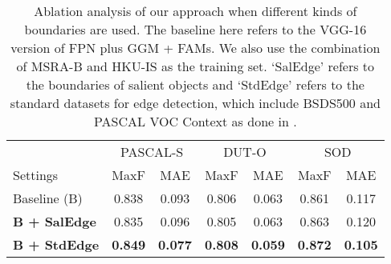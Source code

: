 \documentclass[10pt,twocolumn,letterpaper]{article}
\newcommand{\sorb}[1]{{\textcolor[rgb]{0.72,0.00,0.00}{\textbf{#1}}}}
\begin{document}
\begin{table}[tp]
  \centering
  \small
  \setlength\tabcolsep{1.3mm}
  \begin{tabular}{lcccccc}
    \toprule[1pt]
       & \multicolumn{2}{c}{PASCAL-S \cite{li2014secrets}} & \multicolumn{2}{c}{DUT-O \cite{yang2013saliency}} & \multicolumn{2}{c}{SOD \cite{movahedi2010design}} \\
	\cmidrule(l){2-3} \cmidrule(l){4-5} \cmidrule(l){6-7} 
    Settings & MaxF & MAE & MaxF & MAE & MaxF & MAE \\ \midrule[1pt]
    Baseline (B)  & 0.838 & 0.093 & 0.806 & 0.063 & 0.861 & 0.117  \\ \textbf{B + SalEdge}     & 0.835 & 0.096 & 0.805 & 0.063 & 0.863 & 0.120 \\
    \textbf{B + StdEdge} & \sorb{0.849} & \sorb{0.077} & \sorb{0.808} & \sorb{0.059} & \sorb{0.872} & \sorb{0.105} \\
    \bottomrule[1pt]
  \end{tabular}
  \vspace{3pt}
  \caption{Ablation analysis of our approach when different kinds of boundaries are used. 
  The baseline here refers to the VGG-16 version of FPN plus GGM + FAMs.
  We also use the combination of MSRA-B \cite{liu2011learning} and HKU-IS \cite{li2015visual} as 
  the training set. `SalEdge' refers to the boundaries of salient objects and `StdEdge' refers to
  the standard datasets for edge detection, which include BSDS500 \cite{arbelaez2011contour} and PASCAL VOC Context \cite{mottaghi2014role} as done in \cite{liu2016richer,kokkinos2015pushing}.}
  \label{tab:joint_edge}
  \vspace{-8pt}
\end{table}
\end{document}
